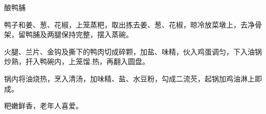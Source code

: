 \begin{recipe}{酿鸭脯}

\ingredients


\cooking

\step 鸭子和姜、葱、花椒，上笼蒸粑，取出拣去姜、葱、花椒，晾冷放菜墩上，去净骨
架，留鸭脯及两腿保持完整，摆入蒸碗。

\step 火腿、兰片、金钩及撕下的鸭肉切成碎颗，加盐、味精，伙入鸡蛋调匀，下入油锅
炒熟，扞入鸭碗内，上笼馏.热，再翻入圆盘。

\step 锅内将油烧热，烹入清汤，加味精、盐、水豆粉，勾成二流芡，起锅加鸡油淋上即
成。

\notes

粑嫩鲜香，老年人喜爱。

\end{recipe}

